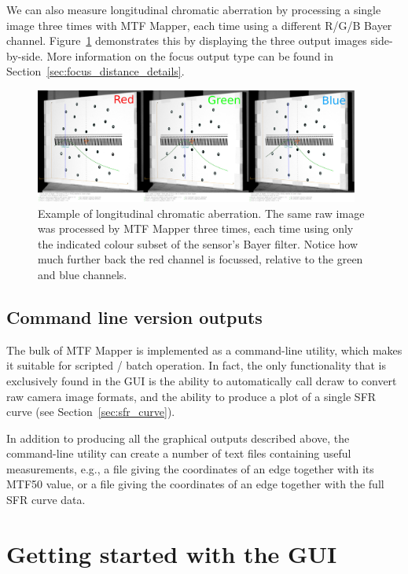 \documentclass[a4paper]{article}
\begin{document}
We can also measure longitudinal chromatic aberration by processing a single
image three times with MTF Mapper, each time using a different R/G/B Bayer
channel. Figure~\ref{fig:loca_example} demonstrates this by displaying the three output
images side-by-side. More information on the
\textsf{focus} output type can be found in
Section~\ref{sec:focus_distance_details}.

\begin{figure}[!ht]
\centering
\includegraphics[width=0.95\textwidth]{figures/loca_example}
\caption{Example of longitudinal chromatic aberration. The same raw image
was processed by MTF Mapper three times, each time using only the indicated
colour subset of the sensor's Bayer filter. Notice how much
further back the red channel is focussed, relative to the green and blue
channels.}
\label{fig:loca_example}
\end{figure}

\subsection{Command line version outputs}
The bulk of MTF Mapper is implemented as a command-line utility, which makes
it suitable for scripted / batch operation. In fact, the only functionality
that is exclusively found in the GUI is the ability to automatically call dcraw to
convert raw camera image formats, and the ability to produce a plot of a
single SFR curve (see Section~\ref{sec:sfr_curve}).

In addition to producing all the graphical outputs described above, the
command-line utility can create a number of text files containing useful
measurements, e.g., a file giving the coordinates of an edge together with
its MTF50 value, or a file giving the coordinates of an edge together with
the full SFR curve data.

\newpage

\section{Getting started with the GUI}
\end{document}
